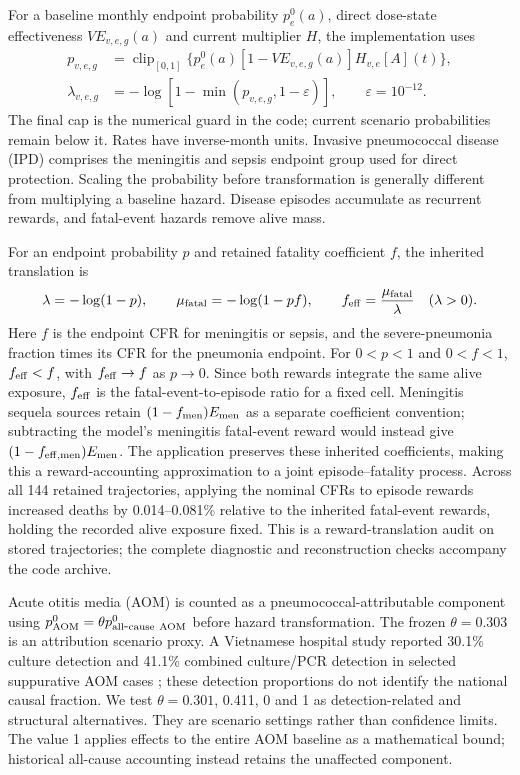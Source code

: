 \documentclass[10pt,letterpaper]{article}
\newcommand{\clip}{\operatorname{clip}}
\begin{document}
For a baseline monthly endpoint probability $p^0_e(a)$, direct dose-state effectiveness $VE_{v,e,g}(a)$ and current multiplier $H$, the implementation uses
\begin{align}
 p_{v,e,g}&=\clip_{[0,1]}\{p^0_e(a)[1-VE_{v,e,g}(a)]H_{v,e}[A](t)\},\nonumber\\
 \lambda_{v,e,g}&=-\log[1-\min(p_{v,e,g},1-\varepsilon)],\qquad\varepsilon=10^{-12}.
 \label{eq:hazard}
\end{align}
The final cap is the numerical guard in the code; current scenario probabilities remain below it. Rates have inverse-month units. Invasive pneumococcal disease (IPD) comprises the meningitis and sepsis endpoint group used for direct protection. Scaling the probability before transformation is generally different from multiplying a baseline hazard. Disease episodes accumulate as recurrent rewards, and fatal-event hazards remove alive mass.

For an endpoint probability $p$ and retained fatality coefficient $f$, the inherited translation is
\begin{equation}
 \lambda=-\log(1-p),\qquad \mu_{\rm fatal}=-\log(1-pf),\qquad
 f_{\rm eff}=\frac{\mu_{\rm fatal}}{\lambda}\quad(\lambda>0).
 \label{eq:cfr_translation}
\end{equation}
Here $f$ is the endpoint CFR for meningitis or sepsis, and the severe-pneumonia fraction times its CFR for the pneumonia endpoint. For $0<p<1$ and $0<f<1$, $f_{\rm eff}<f$, with $f_{\rm eff}\to f$ as $p\to0$. Since both rewards integrate the same alive exposure, $f_{\rm eff}$ is the fatal-event-to-episode ratio for a fixed cell. Meningitis sequela sources retain $(1-f_{\rm men})E_{\rm men}$ as a separate coefficient convention; subtracting the model's meningitis fatal-event reward would instead give $(1-f_{{\rm eff},\rm men})E_{\rm men}$. The application preserves these inherited coefficients, making this a reward-accounting approximation to a joint episode--fatality process.
Across all 144 retained trajectories, applying the nominal CFRs to episode rewards increased deaths by 0.014--0.081\% relative to the inherited fatal-event rewards, holding the recorded alive exposure fixed. This is a reward-translation audit on stored trajectories; the complete diagnostic and reconstruction checks accompany the code archive.

Acute otitis media (AOM) is counted as a pneumococcal-attributable component using $p^0_{\rm AOM}=\theta p^0_{\rm all\mbox{-}cause\ AOM}$ before hazard transformation. The frozen $\theta=0.303$ is an attribution scenario proxy. A Vietnamese hospital study reported 30.1\% culture detection and 41.1\% combined culture/PCR detection in selected suppurative AOM cases \cite{Do2025}; these detection proportions do not identify the national causal fraction. We test $\theta=0.301$, 0.411, 0 and 1 as detection-related and structural alternatives. They are scenario settings rather than confidence limits. The value 1 applies effects to the entire AOM baseline as a mathematical bound; historical all-cause accounting instead retains the unaffected component.
\end{document}

